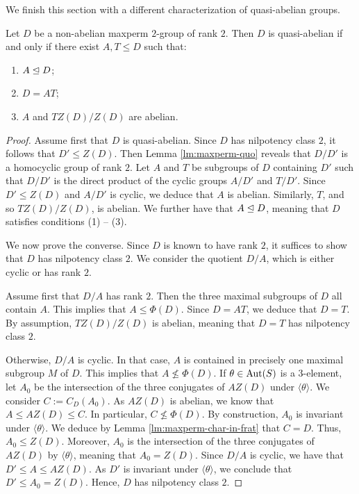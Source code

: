 \documentclass[bysection, amsart]{standard}
\begin{document}
We finish this section with a different characterization of quasi-abelian groups.
\begin{lemma} \label{lm:quasiab-equiv}
    Let $D$ be a non-abelian maxperm $2$-group of rank $2$. Then $D$ is quasi-abelian if and only if there exist $A, T \leq D$ such that:
    \begin{enumerate}
        \item $A \trianglelefteq D$;
        \item $D = AT$; 
        \item $A$ and $TZ(D)/Z(D)$ are abelian.
    \end{enumerate}
\end{lemma}
\begin{proof}
    Assume first that $D$ is quasi-abelian. Since $D$ has nilpotency class $2$, it follows that $D' \leq Z(D)$. Then Lemma \ref{lm:maxperm-quo} reveals that $D/D'$ is a homocyclic group of rank $2$. Let $A$ and $T$ be subgroups of $D$ containing $D'$ such that $D/D'$ is the direct product of the cyclic groups $A/D'$ and $T/D'$. Since $D' \leq Z(D)$ and $A/D'$ is cyclic, we deduce that $A$ is abelian. Similarly, $T$, and so $TZ(D)/Z(D)$, is abelian. We further have that $A \trianglelefteq D$, meaning that $D$ satisfies conditions (1) -- (3).
    
    We now prove the converse. Since $D$ is known to have rank $2$, it suffices to show that $D$ has nilpotency class $2$. We consider the quotient $D/A$, which is either cyclic or has rank $2$.

    Assume first that $D/A$ has rank $2$. Then the three maximal subgroups of $D$ all contain $A$. This implies that $A \leq \Phi(D)$. Since $D = AT$, we deduce that $D = T$. By assumption, $TZ(D)/Z(D)$ is abelian, meaning that $D = T$ has nilpotency class $2$.
    
    Otherwise, $D/A$ is cyclic. In that case, $A$ is contained in precisely one maximal subgroup $M$ of $D$. This implies that $A \nleq \Phi(D)$. If $\theta \in \operatorname{Aut}(S)$ is a $3$-element, let $A_0$ be the intersection of the three conjugates of $AZ(D)$ under $\langle \theta \rangle$. We consider $C := C_D(A_0)$. As $AZ(D)$ is abelian, we know that $A \leq AZ(D) \leq C$. In particular, $C \nleq \Phi(D)$. By construction, $A_0$ is invariant under $\langle \theta \rangle$. We deduce by Lemma \ref{lm:maxperm-char-in-frat} that $C = D$. Thus, $A_0 \leq Z(D)$. Moreover, $A_0$ is the intersection of the three conjugates of $AZ(D)$ by $\langle \theta \rangle$, meaning that $A_0 = Z(D)$. Since $D/A$ is cyclic, we have that $D' \leq A \leq AZ(D)$. As $D'$ is invariant under $\langle \theta \rangle$, we conclude that $D' \leq A_0 = Z(D)$. Hence, $D$ has nilpotency class $2$.
\end{proof}
\end{document}
